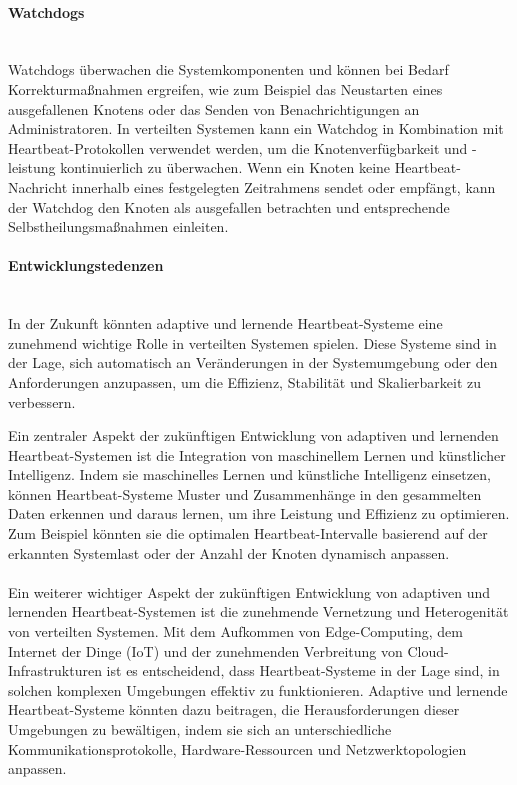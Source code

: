 \documentclass[../vs-script-first-v01.tex]{subfiles}
\begin{document}
\paragraph{Watchdogs}\mbox{}\\
Watchdogs überwachen die Systemkomponenten und können bei Bedarf Korrekturmaßnahmen ergreifen, wie zum Beispiel das Neustarten eines ausgefallenen Knotens oder das Senden von Benachrichtigungen an Administratoren. In verteilten Systemen kann ein Watchdog in Kombination mit Heartbeat-Protokollen verwendet werden, um die Knotenverfügbarkeit und -leistung kontinuierlich zu überwachen. Wenn ein Knoten keine Heartbeat-Nachricht innerhalb eines festgelegten Zeitrahmens sendet oder empfängt, kann der Watchdog den Knoten als ausgefallen betrachten und entsprechende Selbstheilungsmaßnahmen einleiten.
\paragraph{Entwicklungstedenzen}\mbox{}\\
In der Zukunft könnten adaptive und lernende Heartbeat-Systeme eine zunehmend wichtige Rolle in verteilten Systemen spielen. Diese Systeme sind in der Lage, sich automatisch an Veränderungen in der Systemumgebung oder den Anforderungen anzupassen, um die Effizienz, Stabilität und Skalierbarkeit zu verbessern.

Ein zentraler Aspekt der zukünftigen Entwicklung von adaptiven und lernenden Heartbeat-Systemen ist die Integration von maschinellem Lernen und künstlicher Intelligenz. Indem sie maschinelles Lernen und künstliche Intelligenz einsetzen, können Heartbeat-Systeme Muster und Zusammenhänge in den gesammelten Daten erkennen und daraus lernen, um ihre Leistung und Effizienz zu optimieren. Zum Beispiel könnten sie die optimalen Heartbeat-Intervalle basierend auf der erkannten Systemlast oder der Anzahl der Knoten dynamisch anpassen.
\\\\
Ein weiterer wichtiger Aspekt der zukünftigen Entwicklung von adaptiven und lernenden Heartbeat-Systemen ist die zunehmende Vernetzung und Heterogenität von verteilten Systemen. Mit dem Aufkommen von Edge-Computing, dem Internet der Dinge (IoT) und der zunehmenden Verbreitung von Cloud-Infrastrukturen ist es entscheidend, dass Heartbeat-Systeme in der Lage sind, in solchen komplexen Umgebungen effektiv zu funktionieren. Adaptive und lernende Heartbeat-Systeme könnten dazu beitragen, die Herausforderungen dieser Umgebungen zu bewältigen, indem sie sich an unterschiedliche Kommunikationsprotokolle, Hardware-Ressourcen und Netzwerktopologien anpassen.
\end{document}
